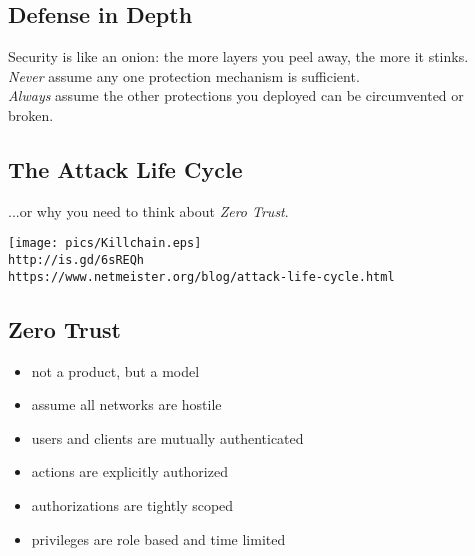 \documentclass[xga]{xdvislides}
\begin{document}
\subsection{Defense in Depth}
\vspace*{\fill}
\Huge
\begin{center}
	Security is like an onion:
	the more layers you peel away, the more it stinks. \\
\addvspace{.5in}
\Normalsize
{\em Never} assume any one protection mechanism is sufficient. \\
\addvspace{.25in}
{\em Always} assume the other protections you deployed
can be circumvented or broken.
\end{center}
\vspace*{\fill}


\subsection{The Attack Life Cycle}
\Normalsize
...or why you need to think about {\em Zero Trust}.
\vspace*{\fill}
\begin{center}
	\texttt{[image: pics/Killchain.eps]} \\
\small
	\verb+http://is.gd/6sREQh+ \\
	\verb+https://www.netmeister.org/blog/attack-life-cycle.html+
\Normalsize
\end{center}
\vspace*{\fill}

\subsection{Zero Trust}
\begin{itemize}
	\item not a product, but a model
	\item assume all networks are hostile
	\item users and clients are mutually authenticated
	\item actions are explicitly authorized
	\item authorizations are tightly scoped
	\item privileges are role based and time limited
\end{itemize}
\end{document}
